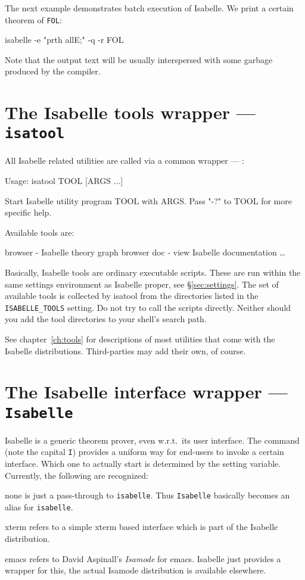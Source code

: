 \medskip The next example demonstrates batch execution of Isabelle. We
print a certain theorem of \texttt{FOL}:
\begin{ttbox}
isabelle -e "prth allE;" -q -r FOL
\end{ttbox}
Note that the output text will be usually interspersed with some
garbage produced by the {\ML} compiler.


\section{The Isabelle tools wrapper --- \texttt{isatool}} \label{sec:isatool}

All Isabelle related utilities are called via a common wrapper ---
:
\begin{ttbox}
Usage: isatool TOOL [ARGS ...]

  Start Isabelle utility program TOOL with ARGS. Pass "-?" to TOOL
  for more specific help.

  Available tools are:

    browser - Isabelle theory graph browser
    doc - view Isabelle documentation
    \dots
\end{ttbox}
Basically, Isabelle tools are ordinary executable scripts.  These are
run within the same settings environment as Isabelle proper, see
\S\ref{sec:settings}.  The set of available tools is collected by
isatool from the directories listed in the \texttt{ISABELLE_TOOLS}
setting.  Do not try to call the scripts directly. Neither should you
add the tool directories to your shell's search path.


\medskip See chapter~\ref{ch:tools} for descriptions of most utilities
that come with the Isabelle distributions. Third-parties may add their
own, of course.


\section{The Isabelle interface wrapper --- \texttt{Isabelle}} \label{sec:interface}

Isabelle is a generic theorem prover, even w.r.t.\ its user interface.
The  command (note the capital \texttt{I}) provides
a uniform way for end-users to invoke a certain interface. Which one
to actually start is determined by the 
setting variable. Currently, the following are recognized:
\begin{ttdescription}
\item[none] is just a pass-through to \texttt{isabelle}. Thus
  \texttt{Isabelle} basically becomes an alias for \texttt{isabelle}.
  
\item[xterm] refers to a simple xterm based interface which is part of
  the Isabelle distribution.
  
\item[emacs] refers to David Aspinall's \emph{Isamode} for emacs.
  Isabelle just provides a wrapper for this, the actual Isamode
  distribution is available elsewhere.
\end{ttdescription}

